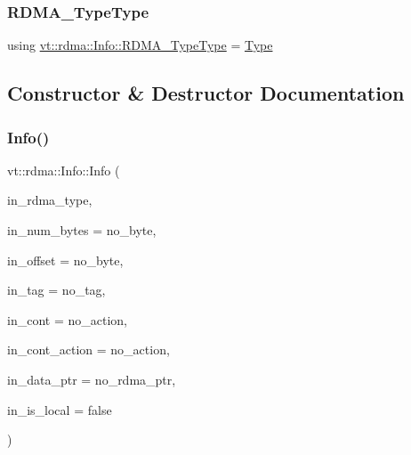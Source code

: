 \subsubsection{\texorpdfstring{R\+D\+M\+A\+\_\+\+Type\+Type}{RDMA\_TypeType}}
{\footnotesize\ttfamily using \hyperlink{namespacevt_1_1rdma_ac848e1d9da43db6294bd06f83e5d3946}{vt\+::rdma\+::\+Info\+::\+R\+D\+M\+A\+\_\+\+Type\+Type} =  \hyperlink{namespacevt_1_1rdma_ac848e1d9da43db6294bd06f83e5d3946}{Type}}



\subsection{Constructor \& Destructor Documentation}
\mbox{\label{structvt_1_1rdma_1_1_info_a9f79490fb7f166889a8cfed10d158d38}} 
\subsubsection{\texorpdfstring{Info()}{Info()}}
{\footnotesize\ttfamily vt\+::rdma\+::\+Info\+::\+Info (\begin{DoxyParamCaption}\item[{\hyperlink{namespacevt_1_1rdma_ac848e1d9da43db6294bd06f83e5d3946}{R\+D\+M\+A\+\_\+\+Type\+Type} const \&}]{in\+\_\+rdma\+\_\+type,  }\item[{\hyperlink{namespacevt_aab8d55968084610ce3b17057981e9300}{Byte\+Type} const \&}]{in\+\_\+num\+\_\+bytes = {\ttfamily no\+\_\+byte},  }\item[{\hyperlink{namespacevt_aab8d55968084610ce3b17057981e9300}{Byte\+Type} const \&}]{in\+\_\+offset = {\ttfamily no\+\_\+byte},  }\item[{\hyperlink{namespacevt_a84ab281dae04a52a4b243d6bf62d0e52}{Tag\+Type} const \&}]{in\+\_\+tag = {\ttfamily no\+\_\+tag},  }\item[{\hyperlink{namespacevt_a9880273f1697d78c2171f8d8f044de51}{R\+D\+M\+A\+\_\+\+Continuation\+Type}}]{in\+\_\+cont = {\ttfamily no\+\_\+action},  }\item[{\hyperlink{namespacevt_ae0a5a7b18cc99d7b732cb4d44f46b0f3}{Action\+Type}}]{in\+\_\+cont\+\_\+action = {\ttfamily no\+\_\+action},  }\item[{\hyperlink{namespacevt_a9e2c953286c7616f7c218e9951790776}{R\+D\+M\+A\+\_\+\+Ptr\+Type} const \&}]{in\+\_\+data\+\_\+ptr = {\ttfamily no\+\_\+rdma\+\_\+ptr},  }\item[{bool const}]{in\+\_\+is\+\_\+local = {\ttfamily false} }\end{DoxyParamCaption})\hspace{0.3cm}{\ttfamily [inline]}}



